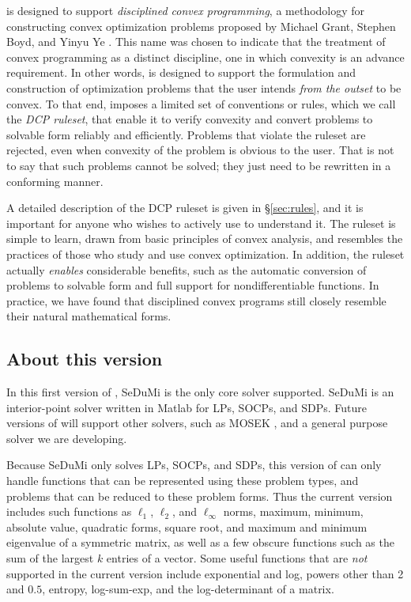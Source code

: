 \documentclass[12pt]{article}
\begin{document}
\cvx is designed to support \emph{disciplined convex programming},
a methodology for constructing convex optimization problems
proposed by Michael Grant, Stephen Boyd, and Yinyu Ye \cite{GBY}.
This name was chosen to indicate that the treatment of convex
programming as a distinct discipline, one in which convexity is an
advance requirement. In other words, \cvx is designed to support the formulation and
construction of optimization problems that the user 
intends \emph{from the outset} to be convex.
To that end, \cvx imposes a limited
set of conventions or rules, which we call the \emph{DCP ruleset},
that enable it to verify convexity
and convert problems to solvable form reliably and efficiently.
Problems that violate the ruleset are rejected, even when
convexity of the problem is obvious to the user.
That is not to say that such problems cannot be solved; they
just need to be rewritten in a conforming manner.

A detailed description of the DCP ruleset is given in \S\ref{sec:rules},
and it is important for anyone who wishes to actively use
\cvx to understand it. The ruleset is simple 
to learn, drawn from basic principles of convex analysis,
and resembles the practices of those who study and use
convex optimization. In addition, the ruleset actually \emph{enables}
considerable benefits, such as the automatic conversion of
problems to solvable
form and full support for nondifferentiable
functions. In practice, we have found that
disciplined convex programs still closely resemble
their natural mathematical forms.

\subsection{About this version}
\label{sec:version}

In this first version of \cvx,
SeDuMi \cite{Stu:99} is the only core solver supported.
SeDuMi is an interior-point solver written in Matlab for 
LPs, SOCPs, and SDPs.
Future versions of \cvx will support other solvers, such as
MOSEK \cite{MOSEK}, and a general purpose solver we are developing.

Because SeDuMi only solves LPs, SOCPs, and SDPs, this
version of \cvx can only handle functions that can be represented
using these problem types, and problems that can be reduced to 
these problem forms. Thus the current version includes such
functions as $\ell_1$, $\ell_2$,
and $\ell_\infty$ norms, maximum, minimum, absolute value,
quadratic forms, square root,
and maximum and minimum eigenvalue of a symmetric matrix,
as well as a few obscure functions such as the 
sum of the largest $k$ entries of a vector.
Some useful functions that are \emph{not} supported in
the current version include
exponential and log, powers other than 2 and $0.5$,
entropy, log-sum-exp, and the log-determinant of a matrix.
\end{document}
